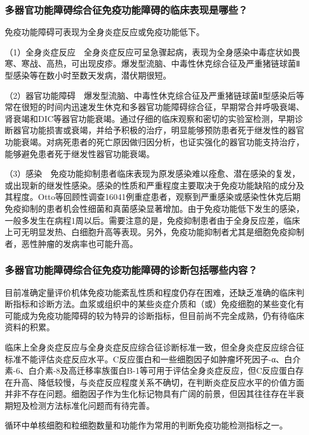 \subsubsection{多器官功能障碍综合征免疫功能障碍的临床表现是哪些？}

免疫功能障碍可表现为全身炎症反应或免疫功能低下。

（1）全身炎症反应　全身炎症反应可呈急骤起病，表现为全身感染中毒症状如畏寒、寒战、高热，可出现皮疹。爆发型流脑、中毒性休克综合征及严重猪链球菌Ⅱ型感染等在数小时至数天发病，潜伏期很短。

（2）器官功能障碍　爆发型流脑、中毒性休克综合征及严重猪链球菌Ⅱ型感染后等常在很短的时间内迅速发生休克和多器官功能障碍综合征，早期常合并呼吸衰竭、肾衰竭和DIC等器官功能衰竭。通过仔细的临床观察和密切的实验室检测，早期诊断器官功能损害或衰竭，并给予积极的治疗，明显能够预防患者死于继发性的器官功能衰竭。对病死患者的死亡原因做归因分析，也证实强化的器官功能支持治疗，能够避免患者死于继发性器官功能衰竭。

（3）感染　免疫功能抑制患者临床表现为原发感染难以痊愈、潜在感染的复发，或出现新的继发性感染。感染的性质和严重程度主要取决于免疫功能缺陷的成分及其程度。Otto等回顾性调查16041例重症患者，观察到严重感染或感染性休克后期免疫抑制的患者机会性细菌和真菌感染显著增加。由于免疫功能低下发生的感染，一般多发生在病程1周以后。需要注意的是，免疫抑制患者由于全身反应差，临床上可无明显发热、白细胞升高等表现。另外，免疫功能抑制者尤其是细胞免疫抑制者，恶性肿瘤的发病率也可能升高。

\subsubsection{多器官功能障碍综合征免疫功能障碍的诊断包括哪些内容？}

目前准确定量评价机体免疫功能紊乱性质和程度仍存在困难，还缺乏准确的临床判断指标和诊断方法。血浆或组织中的某些炎症介质和（或）免疫细胞的某些变化有可能成为免疫功能障碍的较为特异的诊断指标，但目前尚不完全成熟，仍有待临床资料的积累。

临床上全身炎症反应与全身炎症反应综合征诊断标准一致，但全身炎症反应综合征标准不能评估炎症反应水平。C反应蛋白和一些细胞因子如肿瘤坏死因子-α、白介素-6、白介素-8及高迁移率族蛋白B-1等可用于评估全身炎症反应，但C反应蛋白存在升高、降低较慢，与炎症反应程度关系不确切，在判断炎症反应水平的价值方面并非不存在问题。细胞因子作为生化标记物具有广阔的前景，但因其往往存在半衰期短及检测方法标准化问题而有待完善。

循环中单核细胞和粒细胞数量和功能作为常用的判断免疫功能检测指标之一。

